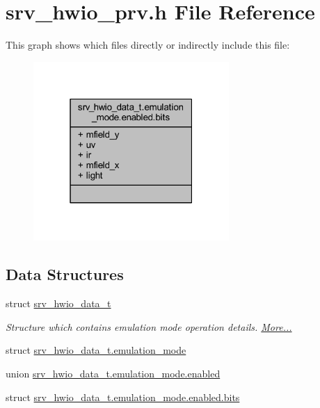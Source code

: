 \hypertarget{a00034}{\section{srv\+\_\+hwio\+\_\+prv.\+h File Reference}
\label{a00034}
}
This graph shows which files directly or indirectly include this file\+:\nopagebreak
\begin{figure}[H]
\begin{center}
\leavevmode
\includegraphics[width=211pt]{d5/d83/a01680}
\end{center}
\end{figure}
\subsection*{Data Structures}
\begin{DoxyCompactItemize}
\item 
struct \hyperlink{a00034_dc/d0c/a00783}{srv\+\_\+hwio\+\_\+data\+\_\+t}
\begin{DoxyCompactList}\small\item\em Structure which contains emulation mode operation details.  \hyperlink{a00034_dc/d0c/a00783}{More...}\end{DoxyCompactList}\item 
struct \hyperlink{a00034_d9/d00/a00784}{srv\+\_\+hwio\+\_\+data\+\_\+t.\+emulation\+\_\+mode}
\item 
union \hyperlink{a00034_d3/d00/a00785}{srv\+\_\+hwio\+\_\+data\+\_\+t.\+emulation\+\_\+mode.\+enabled}
\item 
struct \hyperlink{a00034_d0/d7d/a00786}{srv\+\_\+hwio\+\_\+data\+\_\+t.\+emulation\+\_\+mode.\+enabled.\+bits}
\end{DoxyCompactItemize}
